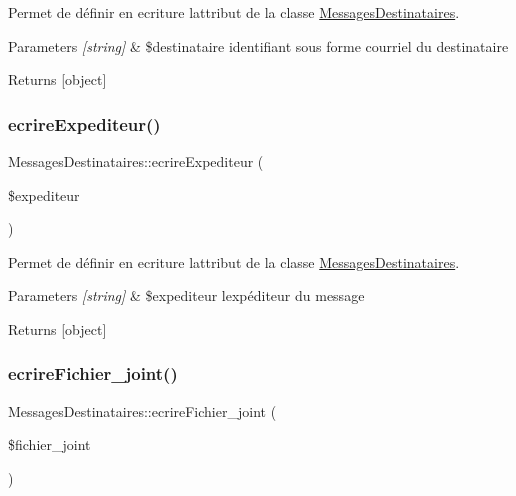 Permet de définir en ecriture l\textquotesingle{}attribut de la classe \hyperlink{class_messages_destinataires}{Messages\+Destinataires}. 


\begin{DoxyParams}{Parameters}
{\em \mbox{[}string\mbox{]}} & \$destinataire identifiant sous forme courriel du destinataire \\
\hline
\end{DoxyParams}
\begin{DoxyReturn}{Returns}
\mbox{[}object\mbox{]} 
\end{DoxyReturn}
\mbox{\label{class_messages_destinataires_ae31ccfd3f4ba85513c3560aff67917f9}} 
\subsubsection{\texorpdfstring{ecrire\+Expediteur()}{ecrireExpediteur()}}
{\footnotesize\ttfamily Messages\+Destinataires\+::ecrire\+Expediteur (\begin{DoxyParamCaption}\item[{}]{\$expediteur }\end{DoxyParamCaption})}



Permet de définir en ecriture l\textquotesingle{}attribut de la classe \hyperlink{class_messages_destinataires}{Messages\+Destinataires}. 


\begin{DoxyParams}{Parameters}
{\em \mbox{[}string\mbox{]}} & \$expediteur l\textquotesingle{}expéditeur du message \\
\hline
\end{DoxyParams}
\begin{DoxyReturn}{Returns}
\mbox{[}object\mbox{]} 
\end{DoxyReturn}
\mbox{\label{class_messages_destinataires_a1631d4919b99b1ee745a0327efa30d56}} 
\subsubsection{\texorpdfstring{ecrire\+Fichier\+\_\+joint()}{ecrireFichier\_joint()}}
{\footnotesize\ttfamily Messages\+Destinataires\+::ecrire\+Fichier\+\_\+joint (\begin{DoxyParamCaption}\item[{}]{\$fichier\+\_\+joint }\end{DoxyParamCaption})}




